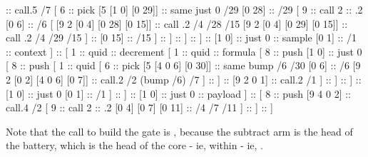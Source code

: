 \begin{code}
[ 8                                          ::  push
  [                                          ::  cons
    [                                        ::  cons
      [ 1                                    ::  quid       :: subtract
        [ 1                                  ::  quid       :: formula
          [ 8                                ::  push
            [9 5 0 7]                        ::  call.5 /7
            [ 6                              ::  pick
              [5 [1 0] [0 29]]               ::  same just 0 /29
              [0 28]                         ::  /29
              [ 9                            ::  call
                2                            ::  .2
                [0 6]                        ::  /6
                [ [9 2 [0 4] [0 28] [0 15]]  ::  call .2 /4 /28 /15
                  [9 2 [0 4] [0 29] [0 15]]  ::  call .2 /4 /29 /15
                ]                            ::
                [0 15]                       ::  /15
              ]                              ::
            ]                                ::
          ]                                  ::
        ]                                    ::
        [1 0]                                ::  just 0    ::  sample
        [0 1]                                ::  /1        ::  context
      ]                                      :: 
      [ 1                                    ::  quid      :: decrement
        [ 1                                  ::  quid      :: formula
          [ 8                                ::  push
            [1 0]                            ::  just 0
            [ 8                              ::  push
              [ 1                            ::  quid
                [ 6                          ::  pick
                  [5 [4 0 6] [0 30]]         ::  same bump /6 /30
                  [0 6]                      ::  /6
                  [9 2 [0 2] [4 0 6] [0 7]]  ::  call.2 /2 (bump /6) /7
                ]                            ::
              ]                              ::
              [9 2 0 1]                      ::  call.2 /1
            ]                                ::
          ]                                  ::
        ]                                    ::
        [1 0]                                ::  just 0
        [0 1]                                ::  /1
      ]                                      ::
    ]                                        ::
    [1 0]                                    ::  just 0    :: payload
  ]                                          :: 
  [ 8                                        ::  push
    [9 4 0 2]                                ::  call.4 /2
    [ 9                                      ::  call
      2                                      ::  .2
      [0 4] [0 7] [0 11]                     ::  /4 /7 /11
    ]                                        ::
  ]                                          ::
]
\end{code}
Note that the call to build the gate is \kode{[9 4 0 2]}, because the
subtract arm is the head of the battery, which is the head of the
core - ie,  within  - ie, .

